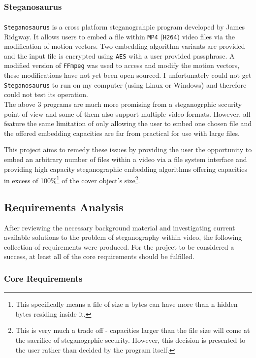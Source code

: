 \documentclass[paper=a4, fontsize=11pt,twoside]{scrartcl}
\numberwithin{table}{section}
\numberwithin{figure}{section}
\numberwithin{algorithm}{section}
\begin{document}
\subsubsection{Steganosaurus}

\texttt{Steganosaurus}\textsuperscript{\cite{steganosaurus}} is a cross platform steganograhpic program developed by James Ridgway. It allows users to embed a file within \texttt{MP4} (\texttt{H264}) video files via the modification of motion vectors. Two embedding algorithm variants are provided and the input file is encrypted using \texttt{AES} with a user provided passphrase. A modified version of \texttt{FFmpeg} was used to access and modify the motion vectors, these modifications have not yet been open sourced. I unfortunately could not get \texttt{Steganosaurus} to run on my computer (using Linux or Windows) and therefore could not test its operation.\\

\noindent
The above 3 programs are much more promising from a steganogrphic security point of view and some of them also support multiple video formats. However, all feature the same limitation of only allowing the user to embed one chosen file and the offered embedding capacities are far from practical for use with large files.

This project aims to remedy these issues by providing the user the opportunity to embed an arbitrary number of files within a video via a file system interface and providing high capacity steganographic embedding algorithms offering capacities in excess of 100\%\footnote{This specifically means a file of size n bytes can have more than n hidden bytes residing inside it.} of the cover object's size\footnote{This is very much a trade off - capacities larger than the file size will come at the sacrifice of steganogrphic security. However, this decision is presented to the user rather than decided by the program itself.}. 

\subsection{Requirements Analysis}

After reviewing the necessary background material and investigating current available solutions to the problem of steganography within video, the following collection of requirements were produced. For the project to be considered a success, at least all of the core requirements should be fulfilled.

\subsubsection{Core Requirements}
\end{document}
